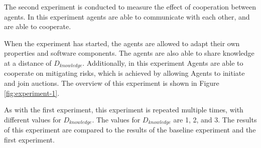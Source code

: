 The second experiment is conducted to measure the effect of cooperation between agents. In this experiment agents are able to communicate with each other, and are able to cooperate. 

When the experiment has started, the agents are allowed to adapt their own properties and software components. The agents are also able to share knowledge at a distance of \( D_{knowledge} \). Additionally, in this experiment Agents are able to cooperate on mitigating risks, which is achieved by allowing Agents to initiate and join auctions. The overview of this experiment is shown in Figure \ref{fig:experiment-1}.

As with the first experiment, this experiment is repeated multiple times, with different values for \( D_{knowledge} \). The values for \( D_{knowledge} \) are 1, 2, and 3. The results of this experiment are compared to the results of the baseline experiment and the first experiment.
